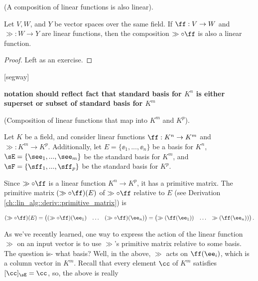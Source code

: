 \begin{theorem}
    (A composition of linear functions is also linear).
    
    Let $V, W$, and $Y$ be vector spaces over the same field. If $\ff:V \rightarrow W$ and $\gg:W \rightarrow Y$ are linear functions, then the composition $\gg \circ \ff$ is also a linear function.
\end{theorem}

\begin{proof}
   Left as an exercise.
\end{proof}

[segway]

\textbf{notation should reflect fact that standard basis for $K^n$ is either superset or subset of standard basis for $K^m$}

\begin{defn}
\label{ch::lin_alg::thm::matrix_matrix_product_relative_to_bases_primitive}
    (Composition of linear functions that map into $K^m$ and $K^p$). 
    
    Let $K$ be a field, and consider linear functions $\ff:K^n \rightarrow K^m$ and $\gg:K^m \rightarrow K^p$. Additionally, let $E = \{\ee_1, ..., \ee_n\}$ be a basis for $K^n$, $\sE = \{\see_1, ..., \see_m\}$ be the standard basis for $K^m$, and $\sF = \{\sff_1, ..., \sff_p\}$ be the standard basis for $K^p$.
    
    Since $\gg \circ \ff$ is a linear function $K^n \rightarrow K^p$, it has a primitive matrix. The primitive matrix $(\gg \circ \ff)(E)$ of $\gg \circ \ff$ relative to $E$ (see Derivation \ref{ch::lin_alg::deriv::primitive_matrix}) is
    
    \begin{align*}
        (\gg \circ \ff)(E)
        =
        \begin{pmatrix}
            (\gg \circ \ff)(\ee_1) & \hdots & (\gg \circ \ff)(\ee_n)
        \end{pmatrix}
        =
        \begin{pmatrix}
            \gg(\ff(\ee_1)) & \hdots & \gg(\ff(\ee_n))
        \end{pmatrix}.
    \end{align*}
    
    As we've recently learned, one way to express the action of the linear function $\gg$ on an input vector is to use $\gg$'s primitive matrix relative to some basis. The question is- what basis? Well, in the above, $\gg$ acts on $\ff(\ee_i)$, which is a column vector in $K^m$. Recall that every element $\cc$ of $K^m$ satisfies $[\cc]_\sE = \cc$, so, the above is really
    

\end{defn}
